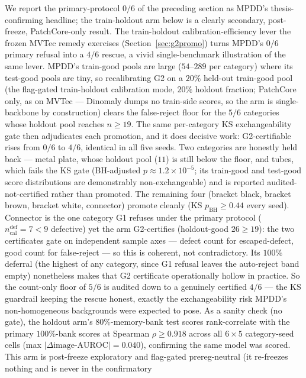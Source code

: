 \documentclass[preprint,11pt]{elsarticle}
\begin{document}
We report the primary-protocol $0/6$ of the preceding section as MPDD's thesis-confirming
headline; the train-holdout arm below is a clearly secondary, post-freeze, PatchCore-only result.
The train-holdout calibration-efficiency lever the frozen MVTec remedy exercises
(Section~\ref{sec:g2promo}) turns MPDD's $0/6$ primary refusal into a $4/6$ rescue, a vivid
single-benchmark illustration of the same lever. MPDD's train-good pools are large ($54$--$289$ per category) where its
test-good pools are tiny, so recalibrating G2 on a $20\%$ held-out train-good pool (the flag-gated
train-holdout calibration mode, $20\%$ holdout fraction; PatchCore only, as on
MVTec --- Dinomaly dumps no train-side scores, so the arm is single-backbone by construction)
clears the false-reject floor for the $5/6$ categories whose holdout pool reaches $n\ge 19$. The
same per-category KS exchangeability gate then adjudicates each promotion, and it does decisive
work: G2-certifiable rises from $0/6$ to $4/6$, identical in all five seeds. Two
categories are honestly held back --- metal plate, whose holdout pool ($11$) is still
below the floor, and tubes, which fails the KS gate (BH-adjusted $p\approx
1.2\times10^{-5}$; its train-good and test-good score distributions are demonstrably
non-exchangeable) and is reported audited-not-certified rather than promoted. The remaining four
(bracket black, bracket brown, bracket white, connector)
promote cleanly (KS $p_{\text{BH}}\ge 0.44$ every seed). Connector is the one category
G1 refuses under the primary protocol ($n_{\text{cal}}^{\text{def}}=7<9$ defective) yet
the arm G2-certifies (holdout-good $26\ge 19$): the two certificates gate on independent sample
axes --- defect count for escaped-defect, good count for false-reject --- so this is coherent, not
contradictory. Its $100\%$ deferral (the highest of any category, since G1 refusal leaves the
auto-reject band empty) nonetheless makes that G2 certificate operationally hollow in practice.
So the count-only floor of $5/6$ is
audited down to a genuinely certified $4/6$ --- the KS guardrail keeping the rescue honest, exactly
the exchangeability risk MPDD's non-homogeneous backgrounds were expected to pose. As a sanity
check (no gate), the holdout arm's $80\%$-memory-bank test scores rank-correlate with the primary
$100\%$-bank scores at Spearman $\rho\ge 0.918$ across all $6\times5$ category-seed cells (max
$|\Delta\text{image-AUROC}|=0.040$), confirming the same model was scored. This arm is post-freeze
exploratory and flag-gated prereg-neutral (it re-freezes nothing and is never in the confirmatory
\end{document}
